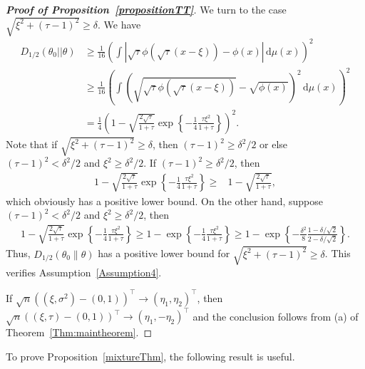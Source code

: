 \documentclass[11pt]{article}
\newcommand{\myT}{\intercal}
\theoremstyle{plain}
\theoremstyle{definition}
\theoremstyle{remark}
\begin{document}
\begin{appendices}
\begin{proof}[\textbf{Proof of Proposition~\ref{propositionTT}}]
We turn to the case $\sqrt{\xi^2+(\tau-1)^2}\geq\delta$.
We have
\begin{equation*}
    \begin{split}
    D_{1/2}(\theta_0||\theta)
    &\geq
    \frac{1}{16}
    \left(\int \left|\sqrt{\tau}\phi(\sqrt{\tau}(x-\xi))-\phi(x)\right| \, \mathrm d\mu (x) \right)^2
    \\
    &\geq
    \frac{1}{16}
\left(
    \int \left(\sqrt{\sqrt{\tau}\phi(\sqrt{\tau}(x-\xi))}-\sqrt{\phi(x)}\right)^2 \, \mathrm d\mu (x)
\right)^2
\\
&=
\frac{1}{4} 
\left( 
1- \sqrt{\frac{2 \sqrt \tau }{1+\tau}} \exp \left\{ - \frac{1}{4} \frac{\tau \xi^2}{1+\tau } \right\}
\right)^2
    .
\end{split}
\end{equation*}
Note that if $\sqrt{\xi^2 + (\tau-1)^2} \geq \delta$, then $(\tau-1)^2 \geq \delta^2/2$ or else $(\tau-1)^2 < \delta^2/2$ and $\xi^2 \geq \delta^2/2$.
If $(\tau-1)^2 \geq \delta^2/2$, then
\begin{align*}
1- \sqrt{\frac{2 \sqrt \tau }{1+\tau}} \exp \left\{ - \frac{1}{4} \frac{\tau \xi^2}{1+\tau } \right\}
\geq&
1- \sqrt{\frac{2 \sqrt \tau }{1+\tau}} 
,
\end{align*}
which obviously has a positive lower bound.
On the other hand, suppose $(\tau-1)^2 < \delta^2/2$ and $\xi^2 \geq \delta^2/2$,
then
\begin{align*}
1- \sqrt{\frac{2 \sqrt \tau }{1+\tau}} \exp \left\{ - \frac{1}{4} \frac{\tau \xi^2}{1+\tau } \right\}
\geq 
1- \exp \left\{ - \frac{1}{4} \frac{\tau \xi^2}{1+\tau } \right\}
\geq 
1- \exp \left\{ - \frac{\delta^2}{8} \frac{1-\delta/\sqrt 2}{2-\delta /\sqrt 2} \right\}.
\end{align*}
Thus, $D_{1/2}(\theta_0 \| \theta)$ has a positive lower bound for $\sqrt{\xi^2+(\tau-1)^2}\geq\delta$.
This verifies Assumption~\ref{Assumption4}.

If $\sqrt{n}((\xi,\sigma^2)-(0,1))^\myT \to (\eta_1,\eta_2)^\myT  $, then $\sqrt{n}((\xi,\tau)-(0,1))^\myT \to (\eta_1,-\eta_2)^\myT  $ and the conclusion follows from (a) of Theorem~\ref{Thm:maintheorem}.
\end{proof}


To prove Proposition~\ref{mixtureThm}, the following result is useful.



\end{appendices}
\end{document}
